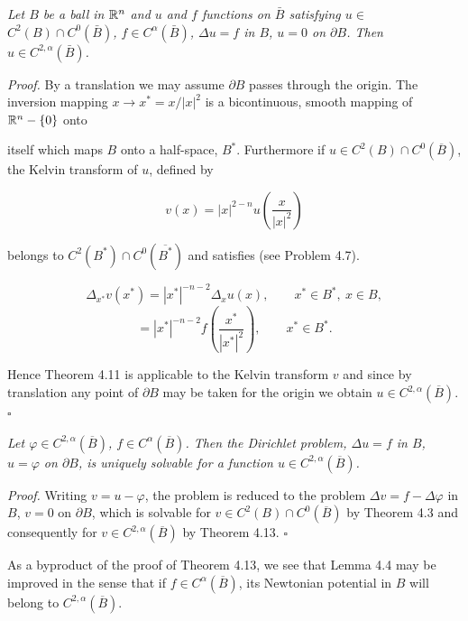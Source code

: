 \begin{theorem}\label{gt:thm-poisson-ball-boundary}
\quad \textit{Let $B$ be a ball in $\mathbb{R}^{n}$ and $u$ and $f$ functions on $\bar{B}$ satisfying $u\in$
$C^{2}(B)\cap C^{0}(\bar{B})$, $f\in C^{\alpha}(\bar{B})$, $\Delta u=f$ in $B$, $u=0$ on $\partial B$. Then $u\in C^{2,\alpha}(\bar{B})$.}

\textit{Proof.} By a translation we may assume $\partial B$ passes through the origin. The inversion
mapping $x\to x^{*}=x/|x|^{2}$ is a bicontinuous, smooth mapping of $\mathbb{R}^{n}-\{0\}$ onto



itself which maps $B$ onto a half-space, $B^{*}$. Furthermore if $u\in C^{2}(B)\cap C^{0}(\overline{B})$, the Kelvin transform of $u$, defined by

\begin{equation}
\tag{4.31}
v(x)=|x|^{2-n}u\!\left(\frac{x}{|x|^{2}}\right)
\end{equation}

belongs to $C^{2}(B^{*})\cap C^{0}(\overline{B^{*}})$ and satisfies (see Problem 4.7).

\begin{equation}
\tag{4.32}
\Delta_{x^{*}}v(x^{*})=|x^{*}|^{-n-2}\Delta_{x}u(x), \qquad x^{*}\in B^{*},\ x\in B,
\end{equation}
\[
=|x^{*}|^{-n-2}f\!\left(\frac{x^{*}}{|x^{*}|^{2}}\right), \qquad x^{*}\in B^{*}.
\]

Hence Theorem 4.11 is applicable to the Kelvin transform $v$ and since by translation any point of $\partial B$ may be taken for the origin we obtain $u\in C^{2,\alpha}(\overline{B})$. $\square$

\end{theorem}

\begin{corollary}\label{gt:cor-poisson-ball-dirichlet}
\textit{Let $\varphi\in C^{2,\alpha}(\overline{B})$, $f\in C^{\alpha}(\overline{B})$. Then the Dirichlet problem, $\Delta u=f$ in $B$, $u=\varphi$ on $\partial B$, is uniquely solvable for a function $u\in C^{2,\alpha}(\overline{B})$.}

\textit{Proof.} Writing $v=u-\varphi$, the problem is reduced to the problem $\Delta v=f-\Delta\varphi$ in $B$, $v=0$ on $\partial B$, which is solvable for $v\in C^{2}(B)\cap C^{0}(\overline{B})$ by Theorem 4.3 and consequently for $v\in C^{2,\alpha}(\overline{B})$ by Theorem 4.13. $\square$

As a byproduct of the proof of Theorem 4.13, we see that Lemma 4.4 may be improved in the sense that if $f\in C^{\alpha}(\overline{B})$, its Newtonian potential in $B$ will belong to $C^{2,\alpha}(\overline{B})$.

\end{corollary}

